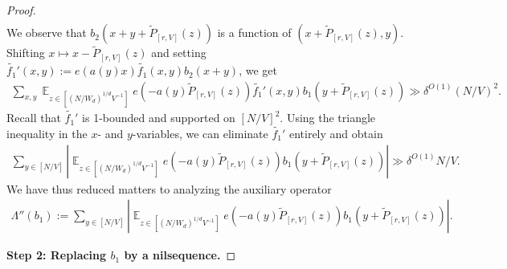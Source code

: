 \documentclass[11pt]{amsart}
\theoremstyle{definition}
\DeclareMathOperator*{\E}{\mathbb{E}}
\newcommand{\abs}[1]{\mathopen{}\left| #1\mathclose{}\right|}
\begin{document}
\begin{proof}
\begin{multline*}
\end{multline*}
We observe that $b_2(x + y + \widetilde{P}_{[r,V]}(z))$ is a function of $(x+\widetilde{P}_{[r,V]}(z), y)$. Shifting $x\mapsto x - \widetilde{P}_{[r,V]}(z)$ and setting $\widetilde{f_1}'(x,y):= e(a(y)x)\widetilde{f_1}(x,y)b_2(x + y)$, we get 
\begin{align*}
\sum_{x, y}\E_{z \in [(N/W_d)^{1/d}V^{-1}]} e(-a(y)\widetilde{P}_{[r,V]}(z))
\widetilde{f_1}'(x, y)
b_1(y+ \widetilde{P}_{[r,V]}(z))  \gg \delta^{O(1)}(N/V)^2.
\end{align*}
Recall that $\widetilde{f_1}'$ is 1-bounded and supported on $[N/V]^2$.  Using the triangle inequality in the $x$- and $y$-variables, we can eliminate $\widetilde {f_1}'$ entirely and obtain
\begin{align*}
\sum_{y\in[N/V]}\abs{\E_{z \in [(N/W_d)^{1/d}V^{-1}]} e(-a(y)\widetilde{P}_{[r,V]}(z))
b_1(y+ \widetilde{P}_{[r,V]}(z))}\gg \delta^{O(1)}N/V.
\end{align*}
We have thus reduced matters to analyzing the auxiliary operator
\begin{align}\label{E: Lambda''}
    \Lambda''(b_1):= \sum_{y\in[N/V]}\abs{\E_{z \in [(N/W_d)^{1/d}V^{-1}]} e(-a(y)\widetilde{P}_{[r,V]}(z))
b_1(y+ \widetilde{P}_{[r,V]}(z))}.
\end{align}

\smallskip
\textbf{Step 2: Replacing $b_1$ by a nilsequence.}
\smallskip


\end{proof}
\end{document}
